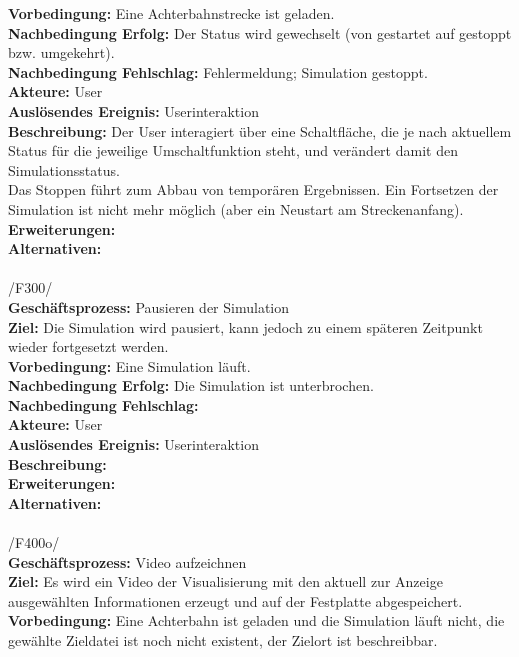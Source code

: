 \textbf{Vorbedingung:} Eine Achterbahnstrecke ist geladen.\\
\textbf{Nachbedingung Erfolg:} Der Status wird gewechselt (von gestartet auf gestoppt bzw. umgekehrt).\\
\textbf{Nachbedingung Fehlschlag:} Fehlermeldung; Simulation gestoppt.\\
\textbf{Akteure:} User\\
\textbf{Auslösendes Ereignis:} Userinteraktion\\
\textbf{Beschreibung:} Der User interagiert über eine Schaltfläche, die je nach aktuellem Status für die jeweilige Umschaltfunktion steht, und verändert damit den Simulationsstatus.\\
Das Stoppen führt zum Abbau von temporären Ergebnissen. Ein Fortsetzen der Simulation ist nicht mehr möglich (aber ein Neustart am Streckenanfang).\\
\textbf{Erweiterungen:}\\
\textbf{Alternativen:}\\
\\
/F300/\\
\textbf{Geschäftsprozess:} Pausieren der Simulation\\
\textbf{Ziel:} Die Simulation wird pausiert, kann jedoch zu einem späteren Zeitpunkt wieder fortgesetzt werden.\\
\textbf{Vorbedingung:} Eine Simulation läuft.\\
\textbf{Nachbedingung Erfolg:} Die Simulation ist unterbrochen.\\
\textbf{Nachbedingung Fehlschlag:} \\
\textbf{Akteure:} User\\
\textbf{Auslösendes Ereignis:} Userinteraktion\\
\textbf{Beschreibung:} \\
\textbf{Erweiterungen:}\\
\textbf{Alternativen:}\\
\\
/F400o/ \\
\textbf{Geschäftsprozess:} Video aufzeichnen\\
\textbf{Ziel:} Es wird ein Video der Visualisierung mit den aktuell zur Anzeige ausgewählten Informationen erzeugt und auf der Festplatte abgespeichert.\\
\textbf{Vorbedingung:} Eine Achterbahn ist geladen und die Simulation läuft nicht, die gewählte Zieldatei ist noch nicht existent, der Zielort ist beschreibbar.\\
